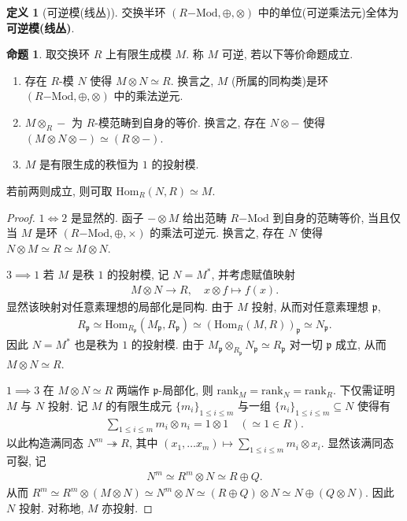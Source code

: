 \documentclass{MainStyle}
\theoremstyle{definition}
\theoremstyle{definition}
\theoremstyle{definition}
\newtheorem{definition}{定义}
\theoremstyle{definition}
\newtheorem{proposition}{命题}
\theoremstyle{definition}
\theoremstyle{definition}
\theoremstyle{definition}
\theoremstyle{remark}
\theoremstyle{remark}
\begin{document}
\begin{definition}[可逆模(线丛)]
    交换半环 $(R\mathrm{-Mod},\oplus, \otimes)$ 中的单位(可逆乘法元)全体为\textbf{可逆模(线丛)}.
\end{definition}

\begin{proposition}
    取交换环 $R$ 上有限生成模 $M$. 称 $M$ 可逆, 若以下等价命题成立.
    \begin{enumerate}
        \item 存在 $R$-模 $N$ 使得 $M\otimes N\simeq R$. 换言之, $M$ (所属的同构类)是环 $(R\mathrm{-Mod},\oplus,\otimes)$ 中的乘法逆元.
        \item $M\otimes_R-$ 为 $R$-模范畴到自身的等价. 换言之, 存在 $N\otimes-$ 使得 $(M\otimes N\otimes -)\simeq (R\otimes -)$.
        \item $M$ 是有限生成的秩恒为 $1$ 的投射模.
    \end{enumerate}
    若前两则成立, 则可取 $\mathrm{Hom}_R(N,R)\simeq M$.
    \begin{proof}
        $1\Longleftrightarrow 2$ 是显然的. 函子 $-\otimes M$ 给出范畴 $R\mathrm{-Mod}$ 到自身的范畴等价, 当且仅当 $M$ 是环 $(R\mathrm{-Mod},\oplus,\times)$ 的乘法可逆元. 换言之, 存在 $N$ 使得 $N\otimes M\simeq R\simeq M\otimes N$. \par
        $3\implies 1$ 若 $M$ 是秩 $1$ 的投射模, 记 $N=M^\ast$, 并考虑赋值映射
        \begin{align*}
            M\otimes N\to R,\quad x\otimes f\mapsto f(x).
        \end{align*}
        显然该映射对任意素理想的局部化是同构. 由于 $M$ 投射, 从而对任意素理想 $\mathfrak p$,
        \begin{align*}
            R_{\mathfrak p}\simeq \mathrm{Hom}_{R_{\mathfrak p}}(M_{\mathfrak p},R_{\mathfrak p})\simeq (\mathrm{Hom}_R(M,R))_{\mathfrak p}\simeq N_{\mathfrak p}.
        \end{align*}
        因此 $N=M^\ast$ 也是秩为 $1$ 的投射模. 由于 $M_{\mathfrak p}\otimes_{R_\mathfrak p} N_{\mathfrak p}\simeq R_{\mathfrak p}$ 对一切 $\mathfrak p$ 成立, 从而 $M\otimes N\simeq R$.\par
        $1\implies 3$ 在 $M\otimes N\simeq R$ 两端作 $\mathfrak p$-局部化, 则 $\mathrm{rank}_M=\mathrm{rank}_N=\mathrm{rank}_R$. 下仅需证明 $M$ 与 $N$ 投射. 记 $M$ 的有限生成元 $\{m_i\}_{1\leq i\leq m}$ 与一组 $\{n_i\}_{1\leq i\leq m}\subseteq N$ 使得有
        \begin{align*}
            \sum_{1\leq i\leq m}m_i\otimes n_i =1\otimes 1\quad \left(\simeq 1\in R\right).
        \end{align*}
        以此构造满同态 $N^m\twoheadrightarrow R$, 其中 $(x_1,\ldots x_m)\mapsto \sum_{1\leq i\leq m}m_i\otimes x_i$. 显然该满同态可裂, 记
        \begin{align*}
            N^m\simeq R^m\otimes N\simeq R\oplus Q.
        \end{align*}
        从而 $R^m\simeq R^m\otimes (M\otimes N)\simeq N^m\otimes N\simeq (R\oplus Q)\otimes N\simeq N\oplus (Q\otimes N)$. 因此 $N$ 投射. 对称地, $M$ 亦投射.
    \end{proof}
\end{proposition}
\end{document}
